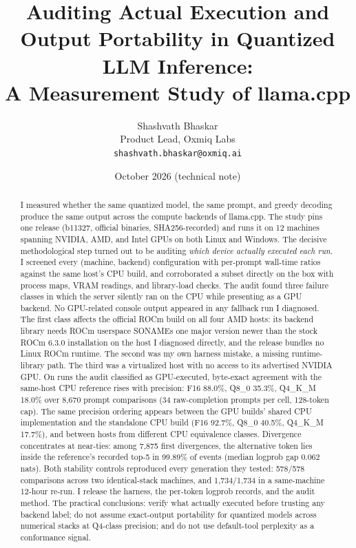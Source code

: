 \documentclass[11pt]{article}
\title{\bf Auditing Actual Execution and Output Portability in
Quantized LLM Inference:\\ A Measurement Study of llama.cpp}
\author{Shashvath Bhaskar\\
Product Lead, Oxmiq Labs\\
\texttt{shashvath.bhaskar@oxmiq.ai}}
\date{October 2026 (technical note)}
\begin{document}
\maketitle

\begin{abstract}
I measured whether the same quantized model, the same prompt, and
greedy decoding produce the same output across the compute backends of
llama.cpp. The study pins one release (b11327, official binaries,
SHA256-recorded) and runs it on 12 machines spanning NVIDIA, AMD, and
Intel GPUs on both Linux and Windows. The decisive methodological step
turned out to be auditing \emph{which device actually executed each
run}. I screened every (machine, backend) configuration with
per-prompt wall-time ratios against the same host's CPU build, and
corroborated a subset directly on the box with process maps, VRAM
readings, and library-load checks. The audit found three failure
classes in which the server silently ran on the CPU while presenting
as a GPU backend. No GPU-related console output appeared in any
fallback run I diagnosed. The first class affects the official ROCm
build on all four AMD hosts: its backend library needs ROCm userspace
SONAMEs one major version newer than the stock ROCm 6.3.0 installation
on the host I diagnosed directly, and the release bundles no Linux
ROCm runtime. The second was my own harness mistake, a missing
runtime-library path. The third was a virtualized host with no access
to its advertised NVIDIA GPU. On runs the audit classified as
GPU-executed, byte-exact agreement with the same-host CPU reference
rises with precision: F16 88.0\%, Q8\_0 35.3\%, Q4\_K\_M 18.0\% over
8{,}670 prompt comparisons (34 raw-completion prompts per cell,
128-token cap). The same precision ordering appears between the GPU
builds' shared CPU implementation and the standalone CPU build (F16
92.7\%, Q8\_0 40.5\%, Q4\_K\_M 17.7\%), and between hosts from
different CPU equivalence classes. Divergence concentrates at
near-ties: among 7{,}875 first divergences, the alternative token lies
inside the reference's recorded top-5 in 99.89\% of events (median
logprob gap 0.062 nats). Both stability controls reproduced every
generation they tested: 578/578 comparisons across two identical-stack
machines, and 1{,}734/1{,}734 in a same-machine 12-hour re-run. I
release the harness, the per-token logprob records, and the audit
method. The practical conclusions: verify what actually executed
before trusting any backend label; do not assume exact-output
portability for quantized models across numerical stacks at Q4-class
precision; and do not use default-tool perplexity as a conformance
signal.
\end{abstract}
\end{document}
